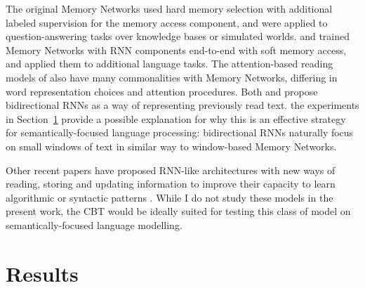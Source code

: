 The original Memory Networks \citep{weston2014memory} used hard memory selection with additional labeled supervision for the memory access component, and
were applied to question-answering tasks 
over knowledge bases or simulated worlds. \cite{sukhbaatar2015end} and \cite{kumar2015ask} trained Memory Networks with RNN components end-to-end with soft memory access, and applied them to additional language tasks. The attention-based reading models of \cite{nips15_hermann} also have many commonalities with Memory Networks, differing in word representation choices 
and attention procedures.
Both \cite{kumar2015ask} and \cite{nips15_hermann} propose bidirectional RNNs as a way of representing previously read text. the experiments in Section~\ref{sec:results} provide a possible explanation for why this is an effective strategy for semantically-focused language processing: bidirectional RNNs naturally focus on small windows of text in similar way to window-based Memory Networks. 

Other recent papers have proposed RNN-like architectures with new ways of reading, storing and updating information to improve their capacity to learn algorithmic or syntactic patterns \citep{joulin2015inferring,dyer2015transition,grefenstette2015learning}. While I do not study these models in the present work, the CBT would be ideally suited for testing this class of model on semantically-focused language modelling.  

\section{Results}


\label{sec:results}

